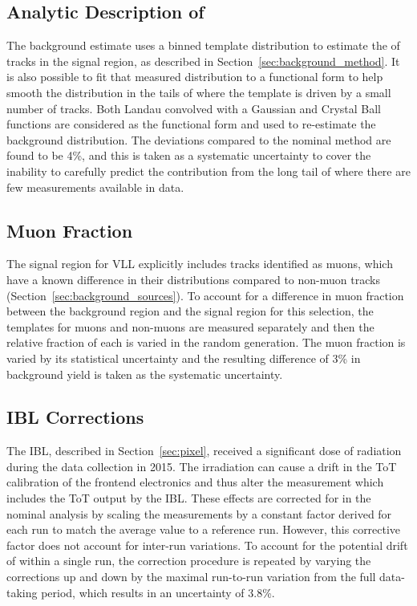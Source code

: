 \subsection{Analytic Description of \dedx}

The background estimate uses a binned template distribution to estimate the \dedx of tracks in the signal region, as described in Section~\ref{sec:background_method}.
It is also possible to fit that measured distribution to a functional form to help smooth the distribution in the tails of \dedx where the template is driven by a small number of tracks.
Both Landau convolved with a Gaussian and Crystal Ball functions are considered as the functional form and used to re-estimate the background distribution.
The deviations compared to the nominal method are found to be 4\%, and this is taken as a systematic uncertainty to cover the inability to carefully predict the contribution from the long tail of \dedx where there are few measurements available in data.

\subsection{Muon Fraction}

The signal region for \ac{VLL} \rhadrons explicitly includes tracks identified as muons, which have a known difference in their \dedx distributions compared to non-muon tracks (Section~\ref{sec:background_sources}).
To account for a difference in muon fraction between the background region and the signal region for this selection, the \dedx templates for muons and non-muons are measured separately and then the relative fraction of each is varied in the random generation.
The muon fraction is varied by its statistical uncertainty and the resulting difference of 3\% in background yield is taken as the systematic uncertainty.

\subsection{\acs{IBL} Corrections}

The \ac{IBL}, described in Section~\ref{sec:pixel}, received a significant dose of radiation during the data collection in 2015.
The irradiation can cause a drift in the \ac{ToT} calibration of the frontend electronics and thus alter the \dedx measurement which includes the \ac{ToT} output by the \ac{IBL}.
These effects are corrected for in the nominal analysis by scaling the \dedx measurements by a constant factor derived for each run to match the average \dedx value to a reference run.
However, this corrective factor does not account for inter-run variations.
To account for the potential drift of \dedx within a single run, the correction procedure is repeated by varying the corrections up and down by the maximal run-to-run variation from the full data-taking period, which results in an uncertainty of 3.8\%.

